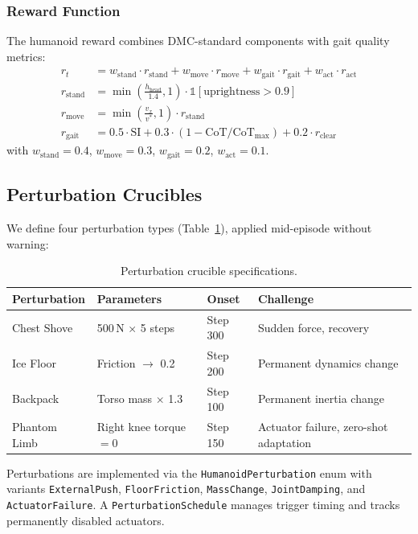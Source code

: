 \documentclass[11pt,a4paper]{article}
\begin{document}
\subsubsection{Reward Function}

The humanoid reward combines DMC-standard components with gait quality metrics:
\begin{align}
r_t &= w_{\text{stand}} \cdot r_{\text{stand}} + w_{\text{move}} \cdot r_{\text{move}} + w_{\text{gait}} \cdot r_{\text{gait}} + w_{\text{act}} \cdot r_{\text{act}} \\
r_{\text{stand}} &= \min\left(\frac{h_{\text{head}}}{1.4}, 1\right) \cdot \mathbb{1}[\text{uprightness} > 0.9] \\
r_{\text{move}} &= \min\left(\frac{v_x}{v^*}, 1\right) \cdot r_{\text{stand}} \\
r_{\text{gait}} &= 0.5 \cdot \text{SI} + 0.3 \cdot (1 - \text{CoT}/\text{CoT}_{\max}) + 0.2 \cdot r_{\text{clear}}
\end{align}
with $w_{\text{stand}} = 0.4$, $w_{\text{move}} = 0.3$, $w_{\text{gait}} = 0.2$, $w_{\text{act}} = 0.1$.

\subsection{Perturbation Crucibles}

We define four perturbation types (Table~\ref{tab:perturbations}), applied mid-episode without warning:

\begin{table}[h]
\centering
\caption{Perturbation crucible specifications.}
\label{tab:perturbations}
\begin{tabular}{p{3cm}p{3.5cm}p{2cm}p{4cm}}
\toprule
\textbf{Perturbation} & \textbf{Parameters} & \textbf{Onset} & \textbf{Challenge} \\
\midrule
Chest Shove    & 500\,N $\times$ 5 steps & Step 300 & Sudden force, recovery \\
Ice Floor      & Friction $\to$ 0.2 & Step 200 & Permanent dynamics change \\
Backpack       & Torso mass $\times$ 1.3 & Step 100 & Permanent inertia change \\
Phantom Limb   & Right knee torque $= 0$ & Step 150 & Actuator failure, zero-shot adaptation \\
\bottomrule
\end{tabular}
\end{table}

Perturbations are implemented via the \texttt{HumanoidPerturbation} enum with variants \texttt{ExternalPush}, \texttt{FloorFriction}, \texttt{MassChange}, \texttt{JointDamping}, and \texttt{ActuatorFailure}.
A \texttt{PerturbationSchedule} manages trigger timing and tracks permanently disabled actuators.
\end{document}
